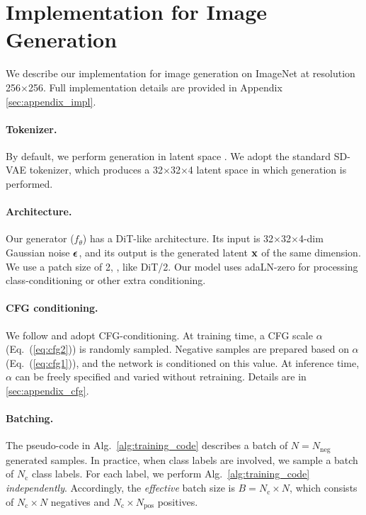 
\section{Implementation for Image Generation}
\label{sec:impl}

We describe our implementation for image generation on ImageNet \cite{deng2009imagenet} at resolution 256$\times$256. Full implementation details are provided in Appendix \ref{sec:appendix_impl}.

\paragraph{Tokenizer.} By default, we perform generation in latent space \cite{rombach2022high}. We adopt the standard SD-VAE tokenizer, which produces a 32$\times$32$\times$4 latent space in which generation is performed.

\paragraph{Architecture.} Our generator ($f_\theta$) has a DiT-like \cite{peebles2023scalable} architecture.
Its input is 32$\times$32$\times$4-dim Gaussian noise ${\boldsymbol{\epsilon}}$, and its output is the generated latent $\mathbf{x}$ of the same dimension.
We use a patch size of 2, \ie, like DiT/2.
Our model uses adaLN-zero \cite{peebles2023scalable} for processing class-conditioning or other extra conditioning.


\paragraph{CFG conditioning.} We follow \cite{geng2025improved} and adopt CFG-conditioning. At training time, a CFG scale $\alpha$ (Eq.~(\ref{eq:cfg2})) is randomly sampled. Negative samples are prepared based on $\alpha$ (Eq.~(\ref{eq:cfg1})), and the network is conditioned on this value. At inference time, $\alpha$ can be freely specified and varied without retraining. Details are in \ref{sec:appendix_cfg}.


\paragraph{Batching.} The pseudo-code in Alg.~\ref{alg:training_code} describes a batch of $N=N_\text{neg}$ generated samples. In practice, when class labels are involved, we sample a batch of $N_\text{c}$ class labels. For each label, we perform Alg.~\ref{alg:training_code} \textit{independently}. Accordingly, the \textit{effective} batch size is $B=N_\text{c}{\times}N$, which consists of $N_\text{c}{\times}N$ negatives and $N_\text{c}{\times}N_\text{pos}$ positives.

